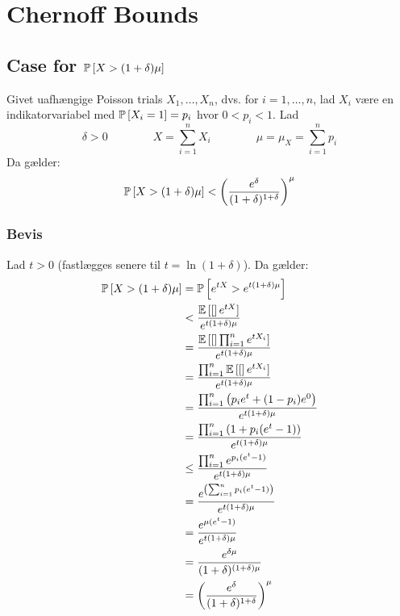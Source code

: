 \section{Chernoff Bounds}
\subsection{Case for $\P{X > (1 + \delta) \mu}$}
Givet uafhængige Poisson trials $X_1, \dots, X_n$, dvs. for $i = 1, \dots, n$, lad $X_i$ være en indikatorvariabel med $\P{X_i = 1} = p_i$ hvor $0 < p_i < 1$. Lad
$$
\delta > 0
\quad\quad\quad\quad
X = \sum_{i=1}^n X_i
\quad\quad\quad\quad
\mu = \mu_X = \sum_{i=1}^n p_i
$$
Da gælder:
\begin{align*}
  \P{X > (1+\delta) \mu} < \pfrac{e^\delta}{(1+\delta)^{1 + \delta}}^\mu
\end{align*}


\subsubsection{Bevis}
Lad $t > 0$ (fastlægges senere til $t = \ln(1 + \delta)$). Da gælder:
\begin{align}
  \P{X > (1+\delta) \mu}
  &= \P{e^{tX} > e^{t(1+\delta) \mu}} \label{eq:i-ete} \\
  &< \frac{\E[e^{tX}]}{e^{t(1+\delta) \mu}} \label{eq:bruger-markov} \\
  &= \frac{\E[\prod_{i=1}^n e^{t X_i}]}{e^{t(1+\delta) \mu}} \label{eq:stok-var} \\
  &= \frac{\prod_{i=1}^n \E[e^{t X_i}]}{e^{t(1+\delta) \mu}} \label{eq:uafhaang} \\
  &= \frac{\prod_{i=1}^n \p{p_i e^t + (1-p_i) e^0 }}{e^{t(1+\delta) \mu}} \label{eq:brug-exp} \\
  &= \frac{\prod_{i=1}^n \p{1 + p_i (e^t - 1)}}{e^{t(1+\delta) \mu}} \label{eq:reducer} \\
  &\leq \frac{\prod_{i=1}^n e^{p_i (e^t - 1)}}{e^{t(1+\delta) \mu}} \label{eq:brug-1+x-regel} \\
  &= \frac{e^{\p{\sum_{i=1}^n p_i (e^t - 1)}}}{e^{t(1+\delta) \mu}} \label{eq:prod-til-sum} \\
  &= \frac{e^{\mu (e^t - 1)}}{e^{t(1+\delta) \mu}} \label{eq:beregn-sum} \\
  &= \frac{e^{\delta \mu}}{(1 + \delta)^{(1 + \delta) \mu}} \label{eq:indsaat-t} \\
  &= \pfrac{e^\delta}{(1 + \delta)^{1 + \delta}}^\mu \label{eq:reducer-potens}
\end{align}

